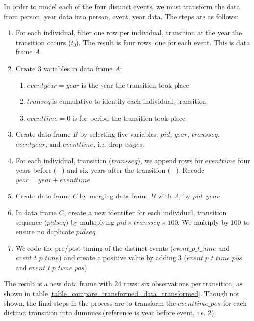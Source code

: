 In order to model each of the four distinct events, we must transform the data from person, year data into person, event, year data.  The steps are as follows:

\begin{enumerate}  
    \item For each individual, filter one row per individual, transition at the year the transition occurs ($t_0$).  The result is four rows, one for each event.  This is data frame $A$.
    \item Create 3 variables in data frame $A$:
    \begin{enumerate}
        \item $eventyear=year$ is the year the transition took place  
        \item $transeq$ is cumulative to identify each individual, transition
        \item $eventtime=0$ is for period the transition took place
    \end{enumerate}  
    \item Create data frame $B$ by selecting five variables: $pid$, $year$, $transseq$, $eventyear$, and $eventtime$, i.e. drop $wages$.  
    \item For each individual, transition ($transseq$), we append rows for $eventtime$ four years before ($-$) and six years after the transition ($+$).  Recode $year=year+eventtime$  
    \item Create data frame $C$ by merging data frame $B$ with $A$, by $pid$, $year$ 
    \item In data frame $C$, create a new identifier for each individual, transition sequence ($pidseq$) by multiplying $pid \times transseq \times 100$.  We multiply by 100 to ensure no duplicate $pidseq$
    \item We code the pre/post timing of the distinct events ($event\_p\_t\_time$ and $event\_t\_p\_time$) and create a positive value by adding 3 ($event\_p\_t\_time\_pos$ and $event\_t\_p\_time\_pos$)
\end{enumerate}  

The result is a new data frame with 24 rows: six observations per transition, as shown in table \ref{table_compare_transformed_data_transformed}.  Though not shown, the final steps in the process are to transform the $eventtime\_pos$ for each distinct transition into dummies (reference is year before event, i.e. 2).  


